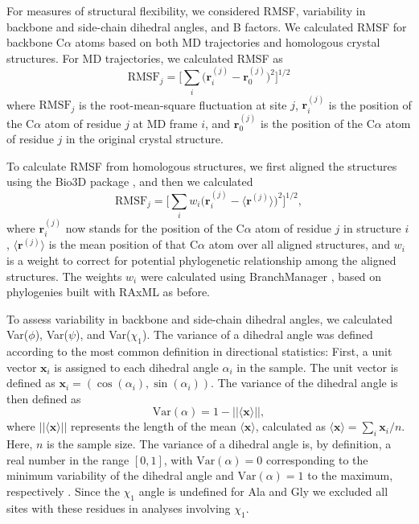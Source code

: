 \documentclass[smallextended]{svjour3}
\begin{document}
For measures of structural flexibility, we considered RMSF, variability in backbone and side-chain dihedral angles, and B factors. We calculated RMSF for backbone C$\alpha$ atoms based on both MD trajectories and homologous crystal structures. For MD trajectories, we calculated RMSF as
\begin{equation}
    \text{RMSF}_j = \Big[\sum_i \big(\mathbf{r}_i^{(j)}-\mathbf{r}_0^{(j)}\big)^2\Big]^{1/2}
\end{equation}
where $\text{RMSF}_j$ is the root-mean-square fluctuation at site $j$, $\mathbf{r}_i^{(j)}$ is the position of the C$\alpha$ atom of residue $j$ at MD frame $i$, and $\mathbf{r}_0^{(j)}$ is the position of the C$\alpha$ atom of residue $j$ in the original crystal structure.

To calculate RMSF from homologous structures, we first aligned the structures using the Bio3D package \citep{Grantetal2006}, and then we calculated
\begin{equation}
    \text{RMSF}_j = \Big[\sum_i w_i\big(\mathbf{r}_i^{(j)}-\langle\mathbf{r}^{(j)}\rangle\big)^2\Big]^{1/2},
\end{equation}
where $\mathbf{r}_i^{(j)}$ now stands for the position of the C$\alpha$ atom of residue $j$ in structure $i$, $\langle\mathbf{r}^{(j)}\rangle$ is the mean position of that C$\alpha$ atom over all aligned structures, and $w_i$ is a weight to correct for potential phylogenetic relationship among the aligned structures. The weights $w_i$ were calculated using BranchManager \citep{StoneSidow2007}, based on phylogenies built with RAxML as before.

To assess variability in backbone and side-chain dihedral angles, we calculated Var($\phi$), Var($\psi$), and Var($\chi_1$). The variance of a dihedral angle was defined according to the most common definition in directional statistics:  
First, a unit vector $\mathbf{x}_i$ is assigned to each dihedral angle $\alpha_i$ in the sample. The unit vector is defined as $\mathbf{x}_i = ( \cos (\alpha_i), \sin (\alpha_i) )$.
The variance of the dihedral angle is then defined as
\begin{equation}
\text{Var}(\alpha) = 1 - ||\langle \mathbf{x}\rangle||,
\end{equation}
where $||\langle \mathbf{x}\rangle||$ represents the length of the mean $\langle \mathbf{x}\rangle$, calculated as $\langle \mathbf{x}\rangle=\sum_i \mathbf{x}_i/n$. Here, $n$ is the sample size. The variance of a dihedral angle is, by definition, a real number in the range $[0,1]$, with $\text{Var}(\alpha) = 0$ corresponding to the minimum variability of the dihedral angle and $\text{Var}(\alpha) = 1$ to the maximum, respectively \citep{Berens2009}. Since the $\chi_1$ angle is undefined for Ala and Gly we excluded all sites with these residues in analyses involving $\chi_1$.
\end{document}
